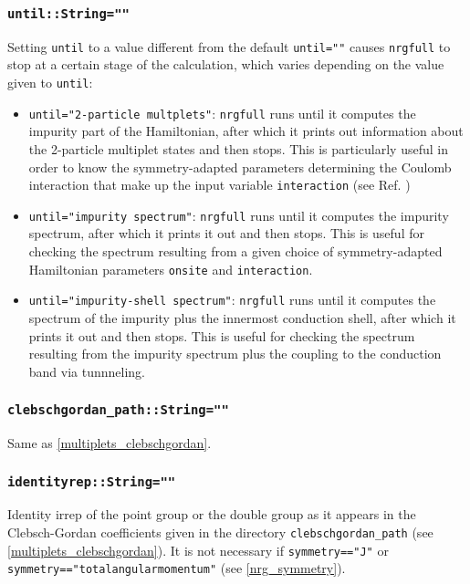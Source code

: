 \documentclass[notitlepage]{article}
\begin{document}
\subsubsection{\texttt{until::String=""}}
\label{nrg_until}
Setting \texttt{until} to a value different from the default
\texttt{until=""} causes \texttt{nrgfull} to stop at a
certain stage of the calculation, which varies depending on
the value given to \texttt{until}:
\begin{itemize}
    \item \texttt{until="2-particle multplets"}:
        \texttt{nrgfull} runs until it computes the impurity
        part of the Hamiltonian, after which it prints out
        information about the 2-particle multiplet states
        and then stops. This is particularly useful in order
        to know the symmetry-adapted parameters determining
        the Coulomb interaction that make up the input
        variable \texttt{interaction} (see Ref. \cite{calvo-fernandez2024})
    \item \texttt{until="impurity spectrum"}:
        \texttt{nrgfull} runs until it computes the impurity
        spectrum, after which it prints it out and then
        stops. This is useful for checking the spectrum
        resulting from a given choice of symmetry-adapted
        Hamiltonian parameters \texttt{onsite} and
        \texttt{interaction}.
    \item \texttt{until="impurity-shell spectrum"}:
        \texttt{nrgfull} runs until it computes the spectrum
        of the impurity plus the innermost conduction shell,
        after which it prints it out and then stops. This is
        useful for checking the spectrum resulting from the
        impurity spectrum plus the coupling to the
        conduction band via tunnneling.
\end{itemize}

\subsubsection{\texttt{clebschgordan\_path::String=""}}
Same as \ref{multiplets_clebschgordan}.

\subsubsection{\texttt{identityrep::String=""}}
\label{nrg_identityrep}
Identity irrep of the point group or the double group as it
appears in the Clebsch-Gordan coefficients given in the
directory \texttt{clebschgordan\_path}
(see \ref{multiplets_clebschgordan}). It is not necessary if
\texttt{symmetry=="J"} or
\texttt{symmetry=="totalangularmomentum"} (see
\ref{nrg_symmetry}).
\end{document}
